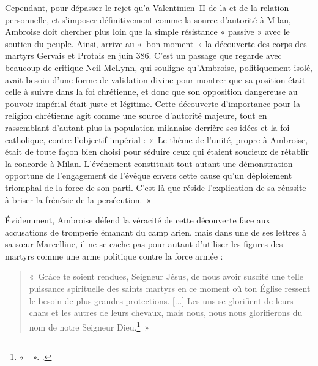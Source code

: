 \bigskip

Cependant, pour dépasser le rejet qu'a Valentinien~II de la  et de la relation personnelle, et s'imposer définitivement comme la source d'autorité à Milan, Ambroise doit chercher plus loin que la simple résistance « passive » avec le soutien du peuple. Ainsi, arrive au «~bon moment~» la découverte des corps des martyrs Gervais et Protais en juin 386. C'est un passage que regarde avec beaucoup de critique Neil McLynn, qui souligne qu'Ambroise, politiquement isolé, avait besoin d'une forme de validation divine pour montrer que sa position était celle à suivre dans la foi chrétienne, et donc que son opposition dangereuse au pouvoir impérial était juste et légitime. Cette découverte d'importance pour la religion chrétienne agit comme une source d'autorité majeure, tout en rassemblant d'autant plus la population milanaise derrière ses idées et la foi catholique, contre l'objectif impérial : «~Le thème de l'unité, propre à Ambroise, était de toute façon bien choisi pour séduire ceux qui étaient soucieux de rétablir la concorde à Milan. L'événement constituait tout autant une démonstration opportune de l'engagement de l'évêque envers cette cause qu'un déploiement triomphal de la force de son parti. C'est là que réside l'explication de sa réussite à briser la frénésie de la persécution.\autocite[215]{mclynn_ambrose}~»

\bigskip

Évidemment, Ambroise défend la véracité de cette découverte face aux accusations de tromperie émanant du camp arien, mais dans une de ses lettres à sa sœur Marcelline, il ne se cache pas pour autant d'utiliser les figures des martyrs comme une arme politique contre la force armée :

\bigskip

\begin{quote}
    «~Grâce te soient rendues, Seigneur Jésus, de nous avoir suscité une telle puissance spirituelle des saints martyrs en ce moment où ton Église ressent le besoin de plus grandes protections. [...] Les uns se glorifient de leurs chars et les autres de leurs chevaux, mais nous, nous nous glorifierons du nom de notre Seigneur Dieu.\footnote{«~~». \cite[, 10]{ambroise_lettres}.}~»
\end{quote}

